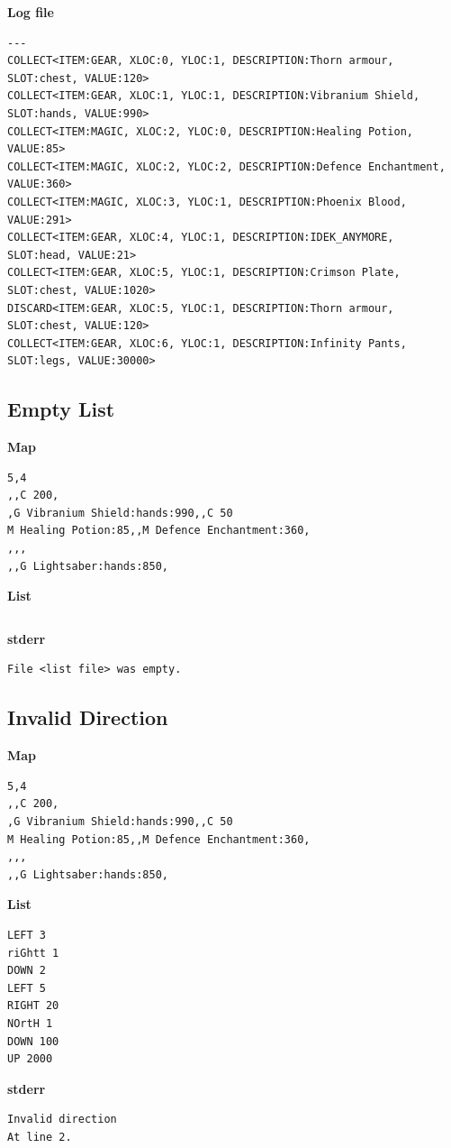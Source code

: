\documentclass{article}
\begin{document}
\textbf{Log file}
\begin{lstlisting}
---
COLLECT<ITEM:GEAR, XLOC:0, YLOC:1, DESCRIPTION:Thorn armour, SLOT:chest, VALUE:120>
COLLECT<ITEM:GEAR, XLOC:1, YLOC:1, DESCRIPTION:Vibranium Shield, SLOT:hands, VALUE:990>
COLLECT<ITEM:MAGIC, XLOC:2, YLOC:0, DESCRIPTION:Healing Potion, VALUE:85>
COLLECT<ITEM:MAGIC, XLOC:2, YLOC:2, DESCRIPTION:Defence Enchantment, VALUE:360>
COLLECT<ITEM:MAGIC, XLOC:3, YLOC:1, DESCRIPTION:Phoenix Blood, VALUE:291>
COLLECT<ITEM:GEAR, XLOC:4, YLOC:1, DESCRIPTION:IDEK_ANYMORE, SLOT:head, VALUE:21>
COLLECT<ITEM:GEAR, XLOC:5, YLOC:1, DESCRIPTION:Crimson Plate, SLOT:chest, VALUE:1020>
DISCARD<ITEM:GEAR, XLOC:5, YLOC:1, DESCRIPTION:Thorn armour, SLOT:chest, VALUE:120>
COLLECT<ITEM:GEAR, XLOC:6, YLOC:1, DESCRIPTION:Infinity Pants, SLOT:legs, VALUE:30000>
\end{lstlisting}

\subsection{Empty List}
\quad \textbf{Map}
\begin{lstlisting}
5,4
,,C 200,
,G Vibranium Shield:hands:990,,C 50
M Healing Potion:85,,M Defence Enchantment:360,
,,,
,,G Lightsaber:hands:850,
\end{lstlisting}

\textbf{List}
\begin{lstlisting}

\end{lstlisting}
\pagebreak

\textbf{stderr}
\begin{lstlisting}
File <list file> was empty.
\end{lstlisting}

\subsection{Invalid Direction}
\quad \textbf{Map}
\begin{lstlisting}
5,4
,,C 200,
,G Vibranium Shield:hands:990,,C 50
M Healing Potion:85,,M Defence Enchantment:360,
,,,
,,G Lightsaber:hands:850,
\end{lstlisting}

\textbf{List}
\begin{lstlisting}
LEFT 3
riGhtt 1
DOWN 2
LEFT 5
RIGHT 20
NOrtH 1
DOWN 100
UP 2000
\end{lstlisting}
\pagebreak

\textbf{stderr}
\begin{lstlisting}
Invalid direction
At line 2.
\end{lstlisting}
\end{document}
